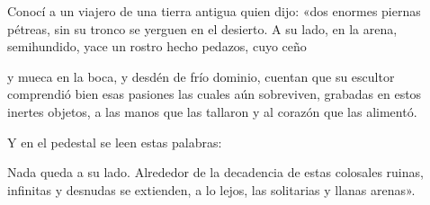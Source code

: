 \startlanguage[es]
\startlines 
Conocí a un viajero de una tierra antigua
quien dijo: «dos enormes piernas pétreas, sin su tronco
se yerguen en el desierto. A su lado, en la arena,
semihundido, yace un rostro hecho pedazos, cuyo ceño

y mueca en la boca, y desdén de frío dominio,
cuentan que su escultor comprendió bien esas pasiones
las cuales aún sobreviven, grabadas en estos inertes objetos,
a las manos que las tallaron y al corazón que las alimentó.

Y en el pedestal se leen estas palabras:

Nada queda a su lado. Alrededor de la decadencia
de estas colosales ruinas, infinitas y desnudas
se extienden, a lo lejos, las solitarias y llanas arenas».
\stoplines 
\stoplanguage